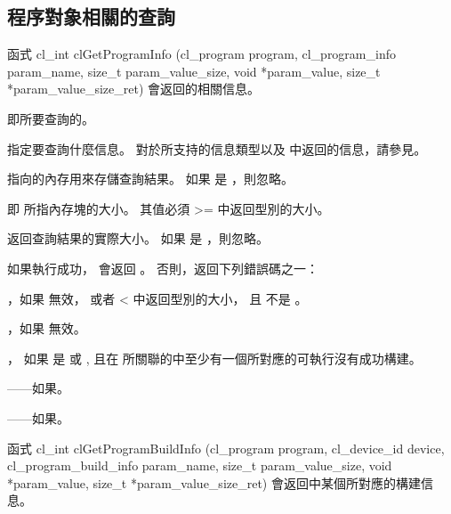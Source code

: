 \subsection{程序對象相關的查詢}

函式
\startclc
cl_int clGetProgramInfo (cl_program program,
			cl_program_info param_name,
			size_t param_value_size,
			void *param_value,
			size_t *param_value_size_ret)
\stopclc
會返回的相關信息。

 即所要查詢的。

 指定要查詢什麼信息。
對於所支持的信息類型以及  中返回的信息，請參見。

 指向的內存用來存儲查詢結果。
如果  是 ，則忽略。

 即  所指內存塊的大小。
其值必須 >= 中返回型別的大小。

 返回查詢結果的實際大小。
如果  是 ，則忽略。


如果執行成功， 會返回 。
否則，返回下列錯誤碼之一：
\startigBase
\item {}，如果  無效，
或者  < 中返回型別的大小，
且  不是 。

\item {}，如果  無效。

\item {}，
如果  是  或 ,
且在  所關聯的中至少有一個所對應的可執行沒有成功構建。

\item {}——如果\scdevfailres。

\item {}——如果\schostfailres。
\stopigBase

函式
\startclc
cl_int clGetProgramBuildInfo (cl_program program,
			cl_device_id device,
			cl_program_build_info param_name,
			size_t param_value_size,
			void *param_value,
			size_t *param_value_size_ret)
\stopclc
會返回中某個所對應的構建信息。

